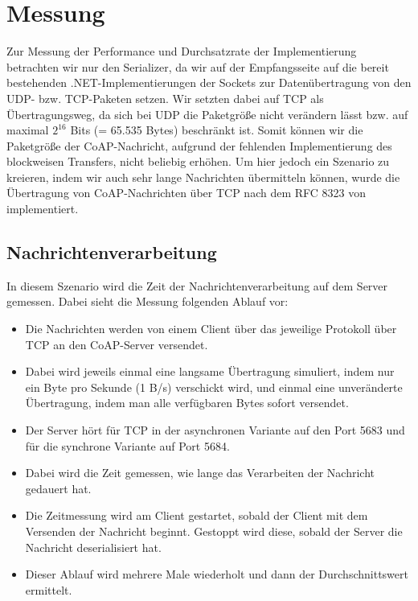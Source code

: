 \section{Messung}
\label{sec:messung}

Zur Messung der Performance und Durchsatzrate der Implementierung betrachten wir nur den Serializer, da wir auf der Empfangsseite auf die bereit bestehenden .NET-Implementierungen der Sockets zur Datenübertragung von den UDP- bzw. TCP-Paketen setzen. Wir setzten dabei auf TCP als Übertragungsweg, da sich bei UDP die Paketgröße nicht verändern lässt bzw. auf maximal $2^{16}$ Bits (= 65.535 Bytes) beschränkt ist. Somit können wir die Paketgröße der CoAP-Nachricht, aufgrund der fehlenden Implementierung des blockweisen Transfers, nicht beliebig erhöhen. Um hier jedoch ein Szenario zu kreieren, indem wir auch sehr lange Nachrichten übermitteln können, wurde die Übertragung von CoAP-Nachrichten über TCP nach dem RFC 8323 von \citeauthor{RFC8323} implementiert.

\subsection{Nachrichtenverarbeitung}
\label{subsec:nachrichtenverarbeitung}

In diesem Szenario wird die Zeit der Nachrichtenverarbeitung auf dem Server gemessen. Dabei sieht die Messung folgenden Ablauf vor:
\begin{itemize}
    \item Die Nachrichten werden von einem Client über das jeweilige Protokoll über TCP an den CoAP-Server versendet.
    \item Dabei wird jeweils einmal eine langsame Übertragung simuliert, indem nur ein Byte pro Sekunde (1 B/s) verschickt wird, und einmal eine unveränderte Übertragung, indem man alle verfügbaren Bytes sofort versendet.
    \item Der Server hört für TCP in der asynchronen Variante auf den Port 5683 und für die synchrone Variante auf Port 5684.
    \item Dabei wird die Zeit gemessen, wie lange das Verarbeiten der Nachricht gedauert hat.
    \item Die Zeitmessung wird am Client gestartet, sobald der Client mit dem Versenden der Nachricht beginnt. Gestoppt wird diese, sobald der Server die Nachricht deserialisiert hat.
    \item Dieser Ablauf wird mehrere Male wiederholt und dann der Durchschnittswert ermittelt.
\end{itemize}

